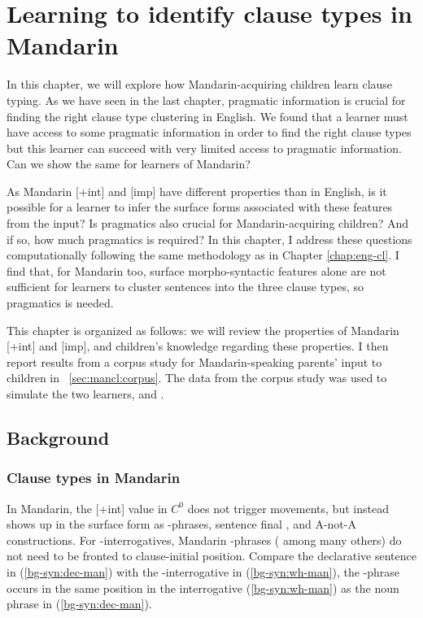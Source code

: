 \chapter{Learning to identify clause types in Mandarin}
\label{chap:man-cl}

In this chapter, we will explore how Mandarin-acquiring children learn clause typing. As we have seen in the last chapter, pragmatic information is crucial for finding the right clause type clustering in English. We found that a learner must have access to some pragmatic information in order to find the right clause types but this learner can succeed with very limited access to pragmatic information. Can we show the same for learners of Mandarin?

As Mandarin [+int] and [imp] have different properties than in English, is it possible for a learner to infer the surface forms associated with these features from the input? Is pragmatics also crucial for Mandarin-acquiring children? And if so, how much pragmatics is required? In this chapter, I address these questions computationally following the same methodology as in Chapter \ref{chap:eng-cl}. I find that, for Mandarin too, surface morpho-syntactic features alone are not sufficient for learners to cluster sentences into the three clause types, so pragmatics is needed. 

This chapter is organized as follows: we will review the properties of Mandarin [+int] and [imp], and children's knowledge regarding these properties. I then report results from a corpus study for Mandarin-speaking parents' input to children in  ~\ref{sec:mancl:corpus}. The data from the corpus study was used to simulate the two learners, \distlearner{} and \praglearner{}.  %

\section{Background}
\label{sec:mancl:bg}
\subsection{Clause types in Mandarin}
\label{sec:mancl:bg:theory}


In Mandarin, the [+int] value in $C^{0}$ does not trigger movements, but instead shows up in the surface form as \twh-phrases, sentence final , and A-not-A constructions. For \twh-interrogatives, Mandarin \twh-phrases (\citealt{huang1982, cheng1991} among many others) do not need to be fronted to clause-initial position. Compare the declarative sentence in (\ref{bg-syn:dec-man}) with the \twh-interrogative in (\ref{bg-syn:wh-man}), the \twh-phrase  occurs in the same position in the interrogative (\ref{bg-syn:wh-man}) as the noun phrase  in (\ref{bg-syn:dec-man}). 



